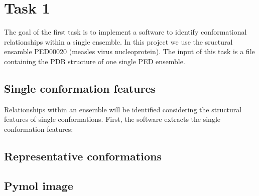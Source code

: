 \section{Task 1}\label{sec:task1}

The goal of the first task is to implement a software to identify conformational relationships within a single ensemble. In this project we use the sructural ensamble PED00020 (measles virus nucleoprotein).
The input of this task is a file containing the PDB structure of one single PED ensemble.

\subsection{Single conformation features}
Relationships within an ensemble will be identified considering the structural features of single conformations.
First, the software extracts the single conformation features:


\subsection{Representative conformations}



\subsection{Pymol image}